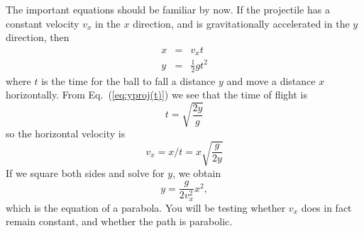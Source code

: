 The important equations should be familiar by now.  If the projectile has a
constant velocity $v_{x}$ in the $x$ direction, and is gravitationally accelerated in
the $y$ direction, then
\begin{eqnarray}
x & \!\!= &\!\! v_{x}t \\        \label{eq:xproj(t)}
y & \!\!= &\!\! \frac{1}{2}gt^{2} \label{eq:yproj(t)}
\end{eqnarray}
where $t$ is the time for the ball to fall a distance $y$ and move
a distance $x$ horizontally.
From Eq.~(\ref{eq:yproj(t)}) we see that the time of flight is
\begin{equation}
t = \sqrt{\frac{2y}{g}}  \label{eq:t(y)}
\end{equation}
so the horizontal velocity is
\begin{equation}
v_{x} = x/t =  x\sqrt{\frac{g}{2y}} \label{eq:vx}
\end{equation}
If we square both sides and solve for $y$, we obtain
\begin{equation}
y = \frac{g}{2v_{x}^{2}}x^{2}, \label{eq:y(x)}
\end{equation}
which is the equation of a parabola.  You will be testing whether $v_{x}$
does in fact remain constant, and whether the path is parabolic.


